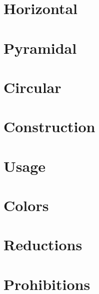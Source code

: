 
\section{Horizontal}
\hypertarget{sec:Concepts:Logo:Horizontal}{}
\label{sec:Concepts:Logo:Horizontal}

\section{Pyramidal}
\section{Circular}
\section{Construction}
\section{Usage}
\section{Colors}
\section{Reductions}
\section{Prohibitions}
